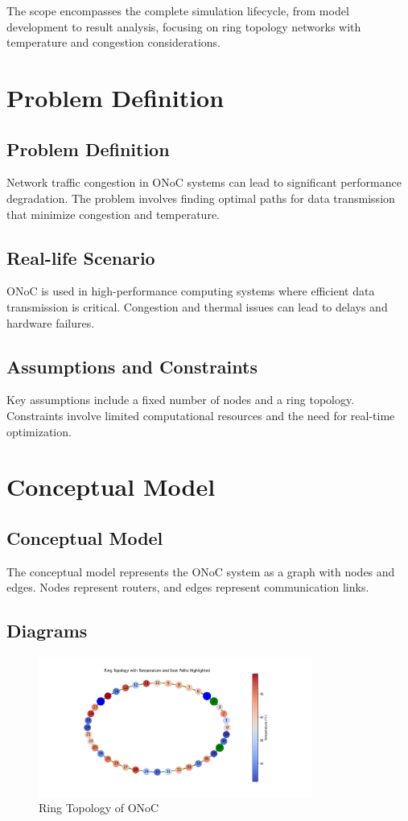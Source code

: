 \documentclass[12pt]{article}
\begin{document}
The scope encompasses the complete simulation lifecycle, from model development to result analysis, focusing on ring topology networks with temperature and congestion considerations.

\section{Problem Definition}
\subsection{Problem Definition}
Network traffic congestion in ONoC systems can lead to significant performance degradation. The problem involves finding optimal paths for data transmission that minimize congestion and temperature.

\subsection{Real-life Scenario}
ONoC is used in high-performance computing systems where efficient data transmission is critical. Congestion and thermal issues can lead to delays and hardware failures.

\subsection{Assumptions and Constraints}
Key assumptions include a fixed number of nodes and a ring topology. Constraints involve limited computational resources and the need for real-time optimization.

\section{Conceptual Model}
\subsection{Conceptual Model}
The conceptual model represents the ONoC system as a graph with nodes and edges. Nodes represent routers, and edges represent communication links.

\subsection{Diagrams}
\begin{figure}[h]
    \centering
    \includegraphics[width=0.8\textwidth]{ring_topology.png}
    \caption{Ring Topology of ONoC}
    \label{fig:ring_topology}
\end{figure}
\end{document}
